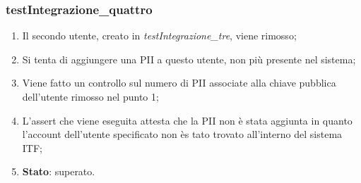 \subsubsection{testIntegrazione\_quattro}
\begin{enumerate}
	\item Il secondo utente, creato in \textit{testIntegrazione\_tre}, viene rimosso;
	\item Si tenta di aggiungere una \gls{PII} a questo utente, non più presente nel sistema;
	\item Viene fatto un controllo sul numero di \gls{PII} associate alla chiave pubblica dell'utente rimosso nel punto 1;
	\item L'assert che viene eseguita attesta che la \gls{PII} non è stata aggiunta in quanto l'account dell'utente specificato non ès tato trovato all'interno del sistema \gls{ITF};
	\item \textbf{Stato}: superato.
\end{enumerate}
